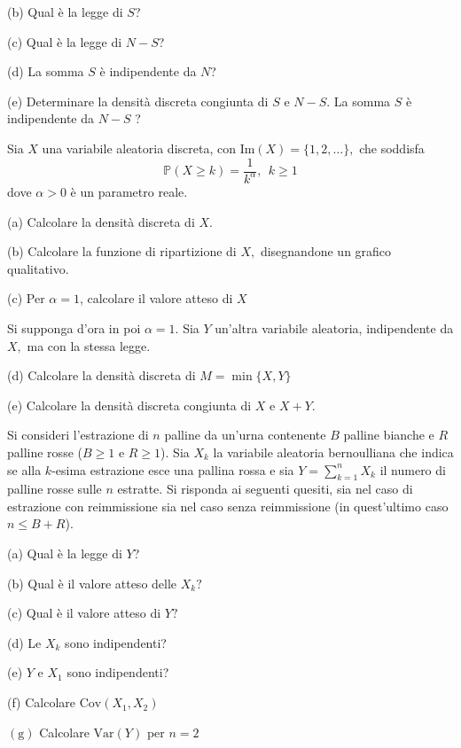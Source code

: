 (b) Qual è la legge di $S$?

(c) Qual è la legge di $N-S$?

(d) La somma $S$ è indipendente da $N$?

(e) Determinare la densità discreta congiunta di $S$ e $N-S$. La somma $S$ è indipendente da $N-S$ ?

Sia $X$ una variabile aleatoria discreta, con $\mathrm{Im} (X)=\{1,2,\dotsc \},$ che soddisfa
\begin{equation*}
\mathbb{P} (X\geq k)=\frac{1}{k^{\alpha }} ,\ \ k\geq 1
\end{equation*}
dove $\alpha  >0$ è un parametro reale.

(a) Calcolare la densità discreta di $X$.

(b) Calcolare la funzione di ripartizione di $X,$ disegnandone un grafico qualitativo.

(c) Per $\alpha =1$, calcolare il valore atteso di $X$

Si supponga d'ora in poi $\alpha =1.$ Sia $Y$ un'altra variabile aleatoria, indipendente da $X,$ ma con la stessa legge.

(d) Calcolare la densità discreta di $M=\min \{X,Y\}$

(e) Calcolare la densità discreta congiunta di $X$ e $X+Y$.

Si consideri l'estrazione di $n$ palline da un'urna contenente $B$ palline bianche e $R$ palline rosse ($B\geq 1$ e $R\geq 1$). Sia $X_{k}$ la variabile aleatoria bernoulliana che indica se alla $k$-esima estrazione esce una pallina rossa e sia $Y=\sum _{k=1}^{n} X_{k}$ il numero di palline rosse sulle $n$ estratte. Si risponda ai seguenti quesiti, sia nel caso di estrazione con reimmissione sia nel caso senza reimmissione (in quest'ultimo caso $n\leq B+R$).

(a) Qual è la legge di $Y$?

(b) Qual è il valore atteso delle $X_{k} ?$

(c) Qual è il valore atteso di $Y?$

(d) Le $X_{k}$ sono indipendenti?

(e) $Y$ e $X_{1}$ sono indipendenti?

(f) Calcolare $\mathrm{Cov}( X_{1} ,X_{2})$

$(\mathrm{g} )$ Calcolare $\mathrm{Var} (Y)$ per $n=2$


